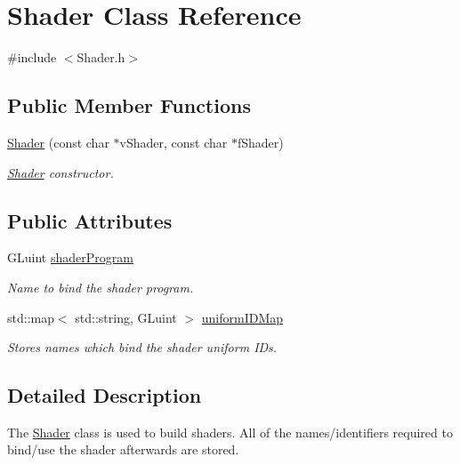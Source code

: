 \hypertarget{class_shader}{}\section{Shader Class Reference}
\label{class_shader}


{\ttfamily \#include $<$Shader.\+h$>$}

\subsection*{Public Member Functions}
\begin{DoxyCompactItemize}
\item 
\hyperlink{class_shader_a6f5fe628c8b29e8d6c81595774951b6c}{Shader} (const char $\ast$v\+Shader, const char $\ast$f\+Shader)
\begin{DoxyCompactList}\small\item\em \hyperlink{class_shader}{Shader} constructor. \end{DoxyCompactList}\end{DoxyCompactItemize}
\subsection*{Public Attributes}
\begin{DoxyCompactItemize}
\item 
G\+Luint \hyperlink{class_shader_acd931b86aee746b644913712e0882940}{shader\+Program}\hypertarget{class_shader_acd931b86aee746b644913712e0882940}{}\label{class_shader_acd931b86aee746b644913712e0882940}

\begin{DoxyCompactList}\small\item\em Name to bind the shader program. \end{DoxyCompactList}\item 
std\+::map$<$ std\+::string, G\+Luint $>$ \hyperlink{class_shader_ad9404aed9f1d09a68b9bff126221cb90}{uniform\+I\+D\+Map}\hypertarget{class_shader_ad9404aed9f1d09a68b9bff126221cb90}{}\label{class_shader_ad9404aed9f1d09a68b9bff126221cb90}

\begin{DoxyCompactList}\small\item\em Stores names which bind the shader uniform I\+Ds. \end{DoxyCompactList}\end{DoxyCompactItemize}


\subsection{Detailed Description}
The \hyperlink{class_shader}{Shader} class is used to build shaders. All of the names/identifiers required to bind/use the shader afterwards are stored. 

